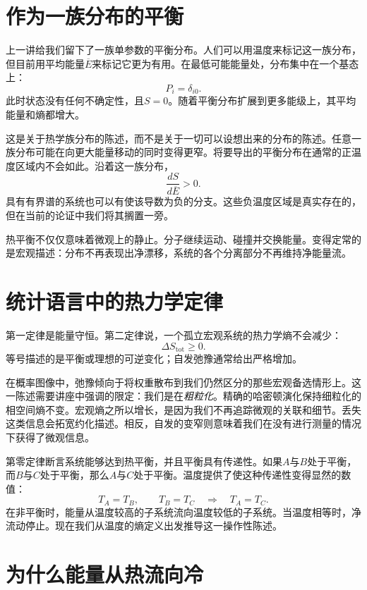 \section{作为一族分布的平衡}

上一讲给我们留下了一族单参数的平衡分布。人们可以用温度来标记这一族分布，但目前用平均能量\(\overline E\)来标记它更为有用。在最低可能能量处，分布集中在一个基态上：
\[
 P_i=\delta_{i0}.
\]
此时状态没有任何不确定性，且\(S=0\)。随着平衡分布扩展到更多能级上，其平均能量和熵都增大。

这是关于热学族分布的陈述，而不是关于一切可以设想出来的分布的陈述。任意一族分布可能在向更大能量移动的同时变得更窄。将要导出的平衡分布在通常的正温度区域内不会如此。沿着这一族分布，
\begin{equation}
 \frac{dS}{d\overline E}>0.
 \label{eq:sm3-positive-temperature-branch}
\end{equation}
具有有界谱的系统也可以有使该导数为负的分支。这些负温度区域是真实存在的，但在当前的论证中我们将其搁置一旁。

热平衡不仅仅意味着微观上的静止。分子继续运动、碰撞并交换能量。变得定常的是宏观描述：分布不再表现出净漂移，系统的各个分离部分不再维持净能量流。

\section{统计语言中的热力学定律}

第一定律是能量守恒。第二定律说，一个孤立宏观系统的热力学熵不会减少：
\begin{equation}
 \Delta S_{\mathrm{tot}}\geq0.
 \label{eq:sm3-second-law}
\end{equation}
等号描述的是平衡或理想的可逆变化；自发弛豫通常给出严格增加。

在概率图像中，弛豫倾向于将权重散布到我们仍然区分的那些宏观备选情形上。这一陈述需要讲座中强调的限定：我们是在\emph{粗粒化}。精确的哈密顿演化保持细粒化的相空间熵不变。宏观熵之所以增长，是因为我们不再追踪微观的关联和细节。丢失这类信息会拓宽约化描述。相反，自发的变窄则意味着我们在没有进行测量的情况下获得了微观信息。

第零定律断言系统能够达到热平衡，并且平衡具有传递性。如果\(A\)与\(B\)处于平衡，而\(B\)与\(C\)处于平衡，那么\(A\)与\(C\)处于平衡。温度提供了使这种传递性变得显然的数值：
\[
 T_A=T_B,\qquad T_B=T_C
 \quad\Longrightarrow\quad
 T_A=T_C.
\]
在非平衡时，能量从温度较高的子系统流向温度较低的子系统。当温度相等时，净流动停止。现在我们从温度的熵定义出发推导这一操作性陈述。

\section{为什么能量从热流向冷}


